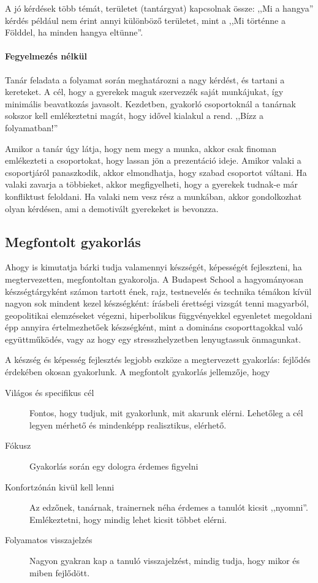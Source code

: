A jó kérdések több témát, területet (tantárgyat) kapcsolnak össze: ,,Mi a
hangya'' kérdés például nem érint annyi különböző területet, mint a ,,Mi
történne a Földdel, ha minden hangya eltünne''.

\paragraph{Fegyelmezés nélkül}
Tanár feladata a folyamat során meghatározni a nagy kérdést, és tartani a
kereteket. A cél, hogy a gyerekek maguk szervezzék saját munkájukat, így
minimális beavatkozás javasolt. Kezdetben, gyakorló csoportoknál a tanárnak
sokszor kell emlékeztetni magát, hogy idővel kialakul a rend. ,,Bízz a
folyamatban!''

Amikor a tanár úgy látja, hogy nem megy a munka, akkor csak finoman emlékezteti
a csoportokat, hogy lassan jön a prezentáció ideje. Amikor valaki a
csoportjáról panaszkodik, akkor elmondhatja, hogy szabad csoportot váltani. Ha
valaki zavarja a többieket, akkor megfigyelheti, hogy a gyerekek tudnak-e már
konfliktust feloldani. Ha valaki nem vesz rész a munkában, akkor gondolkozhat
olyan kérdésen, ami a demotivált gyerekeket is bevonzza.

\subsection{Megfontolt gyakorlás}
Ahogy \citep{ericsson2016peak} is kimutatja bárki tudja valamennyi készségét,
képességét fejleszteni, ha megtervezetten, megfontoltan gyakorolja. A Budapest
School a hagyományosan készségtárgyként számon tartott ének, rajz, testnevelés
és technika témákon kívül nagyon sok mindent kezel készségként: írásbeli
érettségi vizsgát tenni magyarból, geopolitikai elemzéseket végezni,
hiperbolikus függvényekkel egyenletet megoldani épp annyira értelmezhetőek
készségként, mint a domináns csoporttagokkal való együttműködés, vagy az hogy
egy stresszhelyzetben lenyugtassuk önmagunkat.

A készség és képesség fejlesztés legjobb eszköze a megtervezett gyakorlás:
fejlődés érdekében okosan gyakorlunk. A megfontolt gyakorlás jellemzője, hogy

\begin{description}
      \item[Világos és specifikus cél] Fontos, hogy tudjuk, mit gyakorlunk, mit
            akarunk elérni.  Lehetőleg a cél legyen mérhető és mindenképp
            realisztikus,
            elérhető.
      \item[Fókusz] Gyakorlás során egy dologra érdemes figyelni
      \item[Konfortzónán kivül kell lenni] Az edzőnek, tanárnak, trainernek
            néha
            érdemes a tanulót kicsit ,,nyomni''. Emlékeztetni, hogy mindig
            lehet
            kicsit
            többet elérni.
      \item[Folyamatos visszajelzés] Nagyon gyakran kap a tanuló visszajelzést,
            mindig tudja, hogy mikor és miben fejlődött.
\end{description}

